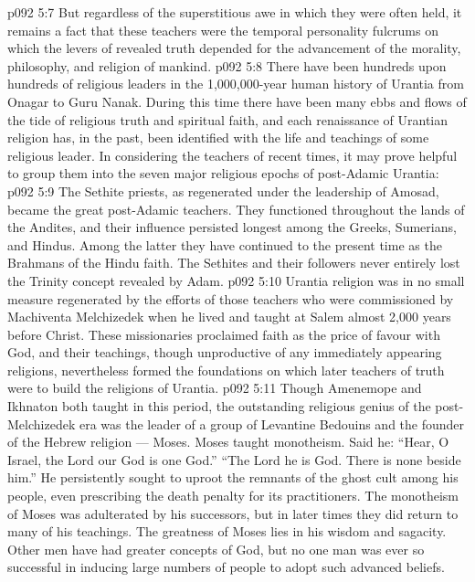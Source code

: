 \vs p092 5:7 But regardless of the superstitious awe in which they were often held, it remains a fact that these teachers were the temporal personality fulcrums on which the levers of revealed truth depended for the advancement of the morality, philosophy, and religion of mankind.
\vs p092 5:8 There have been hundreds upon hundreds of religious leaders in the 1,000,000\hyp{}year human history of Urantia from Onagar to Guru Nanak. During this time there have been many ebbs and flows of the tide of religious truth and spiritual faith, and each renaissance of Urantian religion has, in the past, been identified with the life and teachings of some religious leader. In considering the teachers of recent times, it may prove helpful to group them into the seven major religious epochs of post\hyp{}Adamic Urantia:
\vs p092 5:9 \bibnobreakspace {} The Sethite priests, as regenerated under the leadership of Amosad, became the great post\hyp{}Adamic teachers. They functioned throughout the lands of the Andites, and their influence persisted longest among the Greeks, Sumerians, and Hindus. Among the latter they have continued to the present time as the Brahmans of the Hindu faith. The Sethites and their followers never entirely lost the Trinity concept revealed by Adam.
\vs p092 5:10 \bibnobreakspace {} Urantia religion was in no small measure regenerated by the efforts of those teachers who were commissioned by Machiventa Melchizedek when he lived and taught at Salem almost 2,000 years before Christ. These missionaries proclaimed faith as the price of favour with God, and their teachings, though unproductive of any immediately appearing religions, nevertheless formed the foundations on which later teachers of truth were to build the religions of Urantia.
\vs p092 5:11 \bibnobreakspace {} Though Amenemope and Ikhnaton both taught in this period, the outstanding religious genius of the post\hyp{}Melchizedek era was the leader of a group of Levantine Bedouins and the founder of the Hebrew religion --- Moses. Moses taught monotheism. Said he: “Hear, O Israel, the Lord our God is one God.” “The Lord he is God. There is none beside him.” He persistently sought to uproot the remnants of the ghost cult among his people, even prescribing the death penalty for its practitioners. The monotheism of Moses was adulterated by his successors, but in later times they did return to many of his teachings. The greatness of Moses lies in his wisdom and sagacity. Other men have had greater concepts of God, but no one man was ever so successful in inducing large numbers of people to adopt such advanced beliefs.
